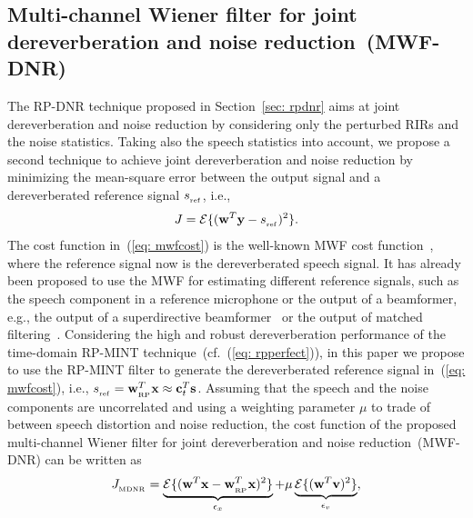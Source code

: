 \documentclass[draftcls,onecolumn,11pt]{IEEEtran}
\begin{document}
\subsection{Multi-channel Wiener filter for joint dereverberation and noise reduction~(MWF-DNR)}
\label{sec: mwfdnr}
The RP-DNR technique proposed in Section~\ref{sec: rpdnr} aims at joint dereverberation and noise reduction by considering only the perturbed RIRs and the noise statistics. 
Taking also the speech statistics into account, we propose a second technique to achieve joint dereverberation and noise reduction by minimizing the mean-square error between the output signal and a dereverberated reference signal $s_{_{\rm ref}}$, i.e., 
\begin{equation}
\label{eq: mwfcost}
J = {\cal{E}} \{( \mathbf{w}^T\mathbf{y} - s_{_{\rm ref}} )^2 \}.
\end{equation}
The cost function in~(\ref{eq: mwfcost}) is the well-known MWF cost function~\cite{Doclo_SC_2007}, where the reference signal now is the dereverberated speech signal.
It has already been proposed to use the MWF for estimating different reference signals, such as the speech component in a reference microphone or the output of a beamformer, e.g., the output of a superdirective beamformer~\cite{Habets_ITASLP_2013} or the output of matched filtering~\cite{Doclo_IWAENC_2001}.
Considering the high and robust dereverberation performance of the time-domain RP-MINT technique~(cf.~(\ref{eq: rpperfect})), in this paper we propose to use the RP-MINT filter to generate the dereverberated reference signal in~(\ref{eq: mwfcost}), i.e., $s_{_{\rm ref}} = \mathbf{w}_{_{\rm RP}}^T\mathbf{x} \approx \mathbf{c}_t^T\mathbf{s}$.
Assuming that the speech and the noise components are uncorrelated and using a weighting parameter $\mu$ to trade of between speech distortion and noise reduction, the cost function of the proposed multi-channel Wiener filter for joint dereverberation and noise reduction~(MWF-DNR) can be written as
\begin{equation}
  \label{eq: mwfdnrcost}
  J_{_{\rm MDNR}} = \underbrace{{\cal{E}}\{(\mathbf{w}^T\mathbf{x} - \mathbf{w}_{_{\rm RP}}^T\mathbf{x})^2 \}}_{\epsilon_{x}} + \mu\underbrace{{\cal{E}}\{(\mathbf{w}^T\mathbf{v})^2 \}}_{\epsilon_v},
\end{equation}
\end{document}
